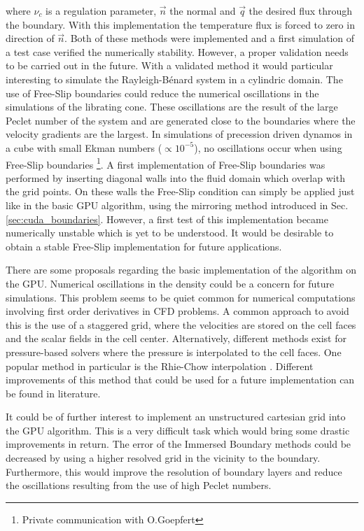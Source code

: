 where $\nu_c$ is a regulation parameter, $\vec{n}$ the normal and $\vec{q}$  the desired flux through the boundary.
With this implementation the temperature flux is forced to zero in direction of $\vec{n}$.
Both of these methods were implemented and a first simulation of a test case verified the numerically stability.
However, a proper validation needs to be carried out in the future.
With a validated method it would  particular interesting to simulate
the Rayleigh-B\'{e}nard system in a cylindric domain.
\clearpage
The use of Free-Slip boundaries could reduce the numerical oscillations in the simulations of the librating cone.
These oscillations are the result of the large Peclet number of the system and are generated
close to the boundaries where the velocity gradients are the largest.
In simulations of precession driven dynamos in a cube with small Ekman numbers ($\propto 10^{-5}$),
no oscillations occur when using Free-Slip boundaries \footnote{Private communication with O.Goepfert}.
A first implementation of Free-Slip boundaries was performed
by inserting diagonal walls into the fluid domain which overlap with the grid points.
On these walls the Free-Slip condition can simply be applied just like in the basic GPU algorithm,
using the mirroring method introduced in Sec. \ref{sec:cuda_boundaries}.
However, a first test of this implementation became numerically unstable which is yet to be understood.
It would be desirable to obtain a stable Free-Slip implementation for future applications.

There are some proposals regarding the basic implementation of the algorithm on the GPU.
Numerical oscillations in the density could be a concern for future simulations.
This problem seems to be quiet common for numerical computations involving first order derivatives in CFD problems.
A common approach to avoid this is the use of a staggered grid, where the velocities
are stored on the cell faces and the scalar fields in the cell center.
Alternatively, different methods exist for pressure-based solvers where the pressure is interpolated to the cell faces.
One popular method in particular is the Rhie-Chow interpolation \citep{Rhie1983}.
Different improvements of this method that could be used for a future implementation can be found in literature.

It could be of further interest to implement an unstructured cartesian grid into the GPU algorithm.
This is a very difficult task which would bring some drastic improvements in return.
The error of the Immersed Boundary methods could be decreased by using a higher resolved grid in the vicinity to the boundary.
Furthermore, this would improve the resolution of boundary layers  and reduce the oscillations resulting from the use of high Peclet numbers.

